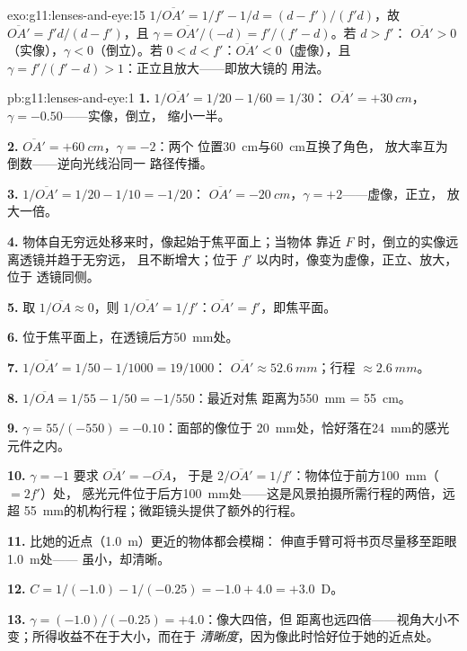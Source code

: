 \begin{solution}{exo:g11:lenses-and-eye:15}
$1/\overline{OA'} = 1/f' - 1/d = (d - f')/(f'd)$，故
$\overline{OA'} = f'd/(d - f')$，且
$\gamma = \overline{OA'}/(-d) = f'/(f' - d)$。若 $d > f'$：
$\overline{OA'} > 0$（实像），$\gamma < 0$（倒立）。若
$0 < d < f'$：$\overline{OA'} < 0$（虚像），且
$\gamma = f'/(f' - d) > 1$：正立且放大——即放大镜的
用法。
\end{solution}

\begin{solution}{pb:g11:lenses-and-eye:1}
\textbf{1.} $1/\overline{OA'} = 1/20 - 1/60 = 1/30$：
$\overline{OA'} = +\qty{30}{cm}$，$\gamma = -0.50$——实像，倒立，
缩小一半。

\textbf{2.} $\overline{OA'} = +\qty{60}{cm}$，$\gamma = -2$：两个
位置\qty{30}{cm}与\qty{60}{cm}互换了角色，
放大率互为倒数——逆向光线沿同一
路径传播。

\textbf{3.} $1/\overline{OA'} = 1/20 - 1/10 = -1/20$：
$\overline{OA'} = \qty{-20}{cm}$，$\gamma = +2$——虚像，正立，
放大一倍。

\textbf{4.} 物体自无穷远处移来时，像起始于焦平面上；当物体
靠近 $F$ 时，倒立的实像远离透镜并趋于无穷远，
且不断增大；位于 $f'$ 以内时，像变为虚像，正立、放大，位于
透镜同侧。

\textbf{5.} 取 $1/\overline{OA} \approx 0$，则
$1/\overline{OA'} = 1/f'$：$\overline{OA'} = f'$，即焦平面。

\textbf{6.} 位于焦平面上，在透镜后方\qty{50}{mm}处。

\textbf{7.} $1/\overline{OA'} = 1/50 - 1/1000 = 19/1000$：
$\overline{OA'} \approx \qty{52.6}{mm}$；行程 $\approx \qty{2.6}{mm}$。

\textbf{8.} $1/\overline{OA} = 1/55 - 1/50 = -1/550$：最近对焦
距离为\qty{550}{mm} = \qty{55}{cm}。

\textbf{9.} $\gamma = 55/(-550) = -0.10$：面部的像位于
\qty{20}{mm}处，恰好落在\qty{24}{mm}的感光元件之内。

\textbf{10.} $\gamma = -1$ 要求 $\overline{OA'} = -\overline{OA}$，
于是 $2/\overline{OA'} = 1/f'$：物体位于前方\qty{100}{mm}（$= 2f'$）处，
感光元件位于后方\qty{100}{mm}处——这是风景拍摄所需行程的两倍，远超
\qty{55}{mm}的机构行程；微距镜头提供了额外的行程。

\textbf{11.} 比她的近点（\qty{1.0}{m}）更近的物体都会模糊：
伸直手臂可将书页尽量移至距眼\qty{1.0}{m}处——
虽小，却清晰。

\textbf{12.} $C = 1/(-1.0) - 1/(-0.25) = -1.0 + 4.0 = +3.0$~D。

\textbf{13.} $\gamma = (-1.0)/(-0.25) = +4.0$：像大四倍，但
距离也远四倍——视角大小不变；所得收益不在于大小，而在于
\emph{清晰度}，因为像此时恰好位于她的近点处。


\end{solution}

